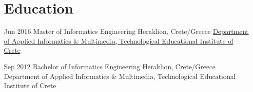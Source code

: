 \begin{entrylist}
\end{entrylist}

\vspace{0.3cm}
\section{\normalfont Education}
\vspace{-0.1cm}
\begin{entrylist}
\entry
{Jun 2016}
{Master {\normalfont of Informatics Engineering}}
{Heraklion, Crete/Greece}
{\href{https://www.teicrete.gr/}{Department of Applied Informatics \& Multimedia, Technological Educational Institute of Crete}}
\\
\vspace{-.4cm}

\entry
{Sep 2012}
{Bachelor {\normalfont of Informatics Engineering}}
{Heraklion, Crete/Greece}
Department of Applied Informatics \& Multimedia, Technological Educational Institute of Crete
\end{entrylist}

\vspace{0.3cm}
